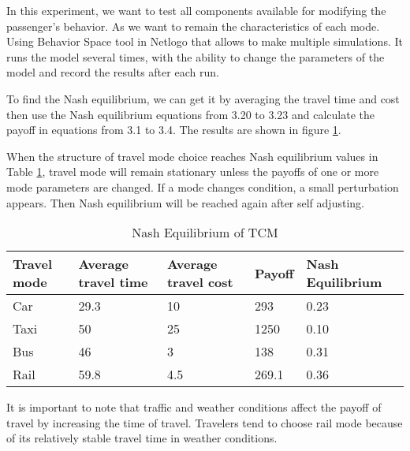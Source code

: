 In this experiment, we want to test all components available for modifying the passenger's behavior. As we want to remain the characteristics of each mode.
Using Behavior Space tool in Netlogo that allows to make multiple simulations. It runs the model several times, with the ability to change the parameters of the model and record the results after each run.

To find the Nash equilibrium, we can get it by averaging the travel time and cost then use the Nash equilibrium equations from 3.20 to 3.23 and calculate the payoff in equations from 3.1 to 3.4. The results are shown in figure \ref{table:2}.

When the structure of travel mode choice reaches Nash equilibrium values in Table \ref{table:2}, travel mode will remain stationary unless the payoffs of one or more mode parameters are changed. If a mode changes condition, a small perturbation appears. Then Nash equilibrium will be reached again after self adjusting.

\begin{table}[h!]
\centering
\begin{tabular}{lllll}
\hline
\multicolumn{1}{l}{Travel mode} & \multicolumn{1}{l}{Average travel time} & \multicolumn{1}{l}{Average travel cost} & \multicolumn{1}{l}{Payoff} & Nash~ Equilibrium  \\ 
\hline
Car                             & 29.3                                    & 10                                      & 293                        & 0.23               \\
Taxi                            & 50                                      & 25                                      & 1250                       & 0.10               \\
Bus                             & 46                                      & 3                                       & 138                        & 0.31               \\
Rail                            & 59.8                                    & 4.5                           & 269.1                      
& 0.36                   
\end{tabular}
\caption{Nash Equilibrium of TCM}
\label{table:2}
\end{table}
It is important to note that traffic and weather conditions affect the payoff of travel by increasing the time of travel. Travelers tend to choose rail mode because of its relatively stable travel time in weather conditions.


